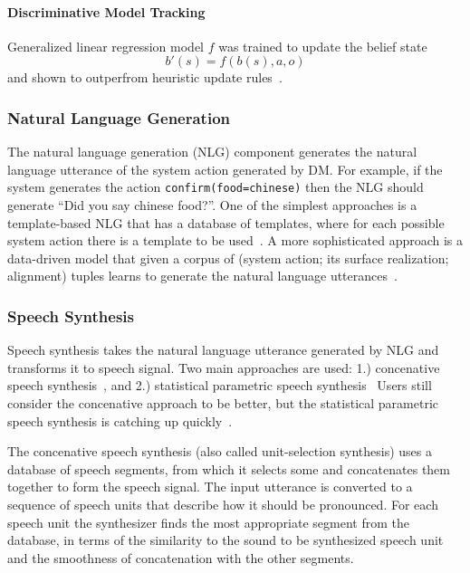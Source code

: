 \documentclass[runningheads,a4paper]{llncs}
\begin{document}
\paragraph*{Discriminative Model Tracking}
Generalized linear regression model $f$ was trained to update the belief state
\begin{equation}b'(s)=f(b(s), a, o)\end{equation}
and shown to outperfrom heuristic update rules~\cite{bohus2006k}.

\subsubsection{Natural Language Generation}
The natural language generation (NLG) component generates the natural language utterance of the system action generated by DM. For example, if the system generates the action \texttt{confirm(food=chinese)} then the NLG should generate ``Did you say chinese food?''. One of the simplest approaches is a template-based NLG that has a database of templates, where for each possible system action there is a template to be used~\cite{duvsek2014alex}. A more sophisticated approach is a data-driven model that given a corpus of (system action; its surface realization; alignment) tuples learns to generate the natural language utterances~\cite{mairesse2010phrase}.

\subsubsection{Speech Synthesis}
Speech synthesis takes the natural language utterance generated by NLG and transforms it to speech signal. Two main approaches are used: 1.) concenative speech synthesis~\cite{campbell1997prosody,masuko1996speech}, and 2.) statistical parametric speech synthesis~\cite{zen2009statistical} Users still consider the concenative approach to be better, but the statistical parametric speech synthesis is catching up quickly~\cite{zen2009statistical}.

The concenative speech synthesis (also called unit-selection synthesis) uses a database of speech segments, from which it selects some and concatenates them together to form the speech signal. The input utterance is converted to a sequence of speech units that describe how it should be pronounced. For each speech unit the synthesizer finds the most appropriate segment from the database, in terms of the similarity to the sound to be synthesized speech unit and the smoothness of concatenation with the other segments.
\end{document}
